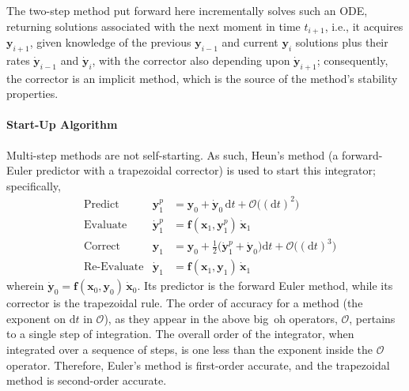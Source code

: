 The two-step method put forward here incrementally solves such an ODE, returning solutions associated with the next moment in time $t_{i+1}$, i.e., it acquires $\mathbf{y}_{i+1}$, given knowledge of the  previous $\mathbf{y}_{i-1}$ and current $\mathbf{y}_i$ solutions plus their rates $\dot{\mathbf{y}}_{i-1}$ and $\dot{\mathbf{y}}_i$, with the corrector also depending upon $\dot{\mathbf{y}}_{i+1}$; consequently, the corrector is an implicit method, which is the source of the method's stability properties.

\paragraph{Start-Up Algorithm}

Multi-step methods are not self-starting.  As such, Heun's method (a forward-Euler predictor with a trapezoidal corrector) is used to start this integrator; specifically,
\begin{subequations}
    \label{startUp1stOrderODEs}
    \begin{align}
    \mbox{} & \text{Predict} & 
    \mathbf{y}_1^p & = \mathbf{y}_0 + \dot{\mathbf{y}}_0 \, \mathrm{d}t + 
    \mathcal{O} \bigl( (\mathrm{d}t)^2 \bigr)
    \label{startUp1stOrderPredictor} \\
    \mbox{} & \text{Evaluate} & 
    \dot{\mathbf{y}}^p_1 & = \mathbf{f} (\mathbf{x}_1 , \mathbf{y}_1^p) \, 
    \dot{\mathbf{x}}_1
    \label{startUp1stEvaluate} \\
    \mbox{} & \text{Correct} &
    \mathbf{y}_1 & = \mathbf{y}_0 + \tfrac{1}{2} 
    \bigl( \dot{\mathbf{y}}_1^p + \dot{\mathbf{y}}_0 \bigr) \mathrm{d}t + 
    \mathcal{O} \bigl( (\mathrm{d}t)^3 \bigr)
    \label{startUp1stOrderCorrector} \\
    \mbox{} & \text{Re-Evaluate} & 
    \dot{\mathbf{y}}_1 & = \mathbf{f} (\mathbf{x}_1 , \mathbf{y}_1) \,
    \dot{\mathbf{x}}_1 
    \label{startUp1stReEvaluate}
    \end{align}
\end{subequations}
wherein $\dot{\mathbf{y}}_0 = \mathbf{f}(\mathbf{x}_0, \mathbf{y}_0) \, \dot{\mathbf{x}}_0$.  Its predictor is the forward Euler method, while its corrector is the trapezoidal rule.  The order of accuracy for a method (the exponent on $\mathrm{d}t$ in $\mathcal{O}$), as they appear in the above big~oh operators, $\mathcal{O}$, pertains to a single step of integration.  The overall order of the integrator, when integrated over a sequence of steps, is one less than the exponent inside the $\mathcal{O}$ operator.  Therefore, Euler's method is first-order accurate, and the trapezoidal method is second-order accurate.

